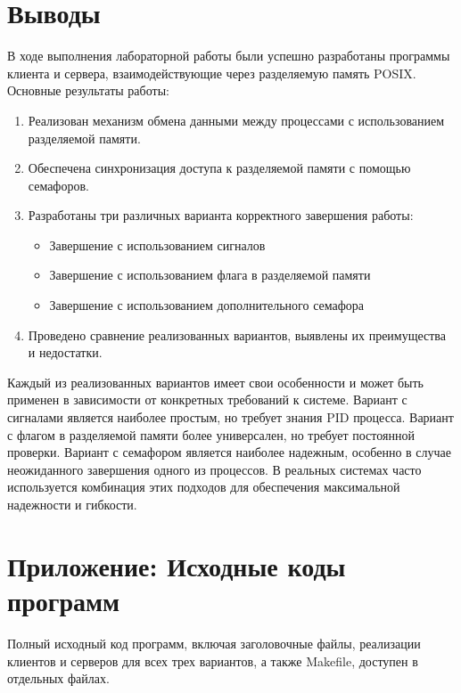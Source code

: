 \documentclass[a4paper,12pt]{article}
\begin{document}
\section{Выводы}
В ходе выполнения лабораторной работы были успешно разработаны программы клиента и сервера, взаимодействующие через разделяемую память POSIX. Основные результаты работы:
\begin{enumerate}
    \item Реализован механизм обмена данными между процессами с использованием разделяемой памяти.
    \item Обеспечена синхронизация доступа к разделяемой памяти с помощью семафоров.
    \item Разработаны три различных варианта корректного завершения работы:
    \begin{itemize}
        \item Завершение с использованием сигналов
        \item Завершение с использованием флага в разделяемой памяти
        \item Завершение с использованием дополнительного семафора
    \end{itemize}
    \item Проведено сравнение реализованных вариантов, выявлены их преимущества и недостатки.
\end{enumerate}
Каждый из реализованных вариантов имеет свои особенности и может быть применен в зависимости от конкретных требований к системе. Вариант с сигналами является наиболее простым, но требует знания PID процесса. Вариант с флагом в разделяемой памяти более универсален, но требует постоянной проверки. Вариант с семафором является наиболее надежным, особенно в случае неожиданного завершения одного из процессов.
В реальных системах часто используется комбинация этих подходов для обеспечения максимальной надежности и гибкости.
\section{Приложение: Исходные коды программ}
Полный исходный код программ, включая заголовочные файлы, реализации клиентов и серверов для всех трех вариантов, а также Makefile, доступен в отдельных файлах.
\end{document}
